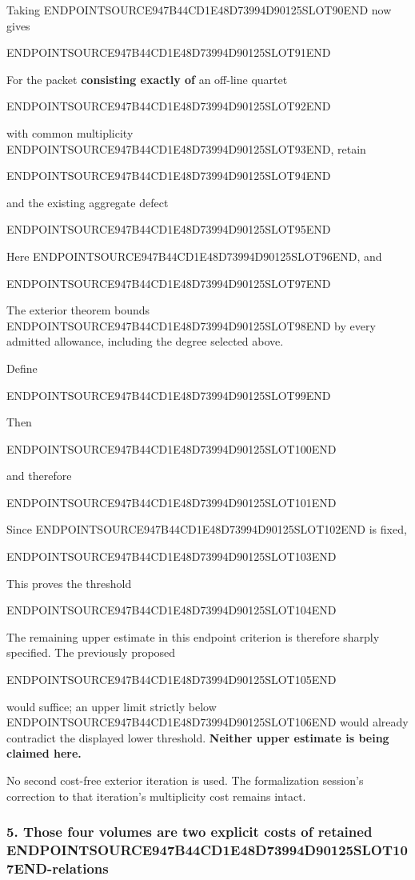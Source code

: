 Taking ENDPOINTSOURCE947B44CD1E48D73994D90125SLOT90END now gives

ENDPOINTSOURCE947B44CD1E48D73994D90125SLOT91END

For the packet \textbf{consisting exactly of} an off-line quartet

ENDPOINTSOURCE947B44CD1E48D73994D90125SLOT92END

with common multiplicity ENDPOINTSOURCE947B44CD1E48D73994D90125SLOT93END, retain

ENDPOINTSOURCE947B44CD1E48D73994D90125SLOT94END

and the existing aggregate defect

ENDPOINTSOURCE947B44CD1E48D73994D90125SLOT95END

Here ENDPOINTSOURCE947B44CD1E48D73994D90125SLOT96END, and

ENDPOINTSOURCE947B44CD1E48D73994D90125SLOT97END

The exterior theorem bounds ENDPOINTSOURCE947B44CD1E48D73994D90125SLOT98END by every admitted allowance, including the degree selected above.

Define

ENDPOINTSOURCE947B44CD1E48D73994D90125SLOT99END

Then

ENDPOINTSOURCE947B44CD1E48D73994D90125SLOT100END

and therefore

ENDPOINTSOURCE947B44CD1E48D73994D90125SLOT101END

Since ENDPOINTSOURCE947B44CD1E48D73994D90125SLOT102END is fixed,

ENDPOINTSOURCE947B44CD1E48D73994D90125SLOT103END

This proves the threshold

ENDPOINTSOURCE947B44CD1E48D73994D90125SLOT104END

The remaining upper estimate in this endpoint criterion is therefore sharply specified. The previously proposed

ENDPOINTSOURCE947B44CD1E48D73994D90125SLOT105END

would suffice; an upper limit strictly below ENDPOINTSOURCE947B44CD1E48D73994D90125SLOT106END would already contradict the displayed lower threshold. \textbf{Neither upper estimate is being claimed here.}

No second cost-free exterior iteration is used. The formalization session's correction to that iteration's multiplicity cost remains intact.

\subsubsection{\texorpdfstring{5. Those four volumes are two explicit costs of retained ENDPOINTSOURCE947B44CD1E48D73994D90125SLOT107END-relations}{5. Those four volumes are two explicit costs of retained -relations}}\label{endpoint-user_norm_original--those-four-volumes-are-two-explicit-costs-of-retained-e-relations}

